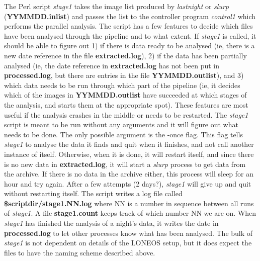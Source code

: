 \documentclass{article}
\newcommand\pr{\em}                   %
\newcommand\ff{\bf}                   %
\begin{document}
{The Perl script {\pr stage1} takes the image list produced by {\pr
lastnight} or {\pr slurp} ({\ff YYMMDD.inlist}) and passes the list to
the controller program {\pr control1} which performs the parallel
analysis.  The script has a few features to decide which files have
been analysed through the pipeline and to what extent.  If {\pr
stage1} is called, it should be able to figure out 1) if there is data
ready to be analysed (ie, there is a new date reference in the file
{\ff extracted.log}), 2) if the data has been partially analysed (ie,
the date reference in {\ff extracted.log} has not been put in {\ff
processed.log}, but there are entries in the file {\ff
YYMMDD.outlist}), and 3) which data needs to be run through which part
of the pipeline (ie, it decides which of the images in {\ff
YYMMDD.outlist} have succeeded at which stages of the analysis, and
starts them at the appropriate spot).  These features are most useful
if the analysis crashes in the middle or needs to be restarted.  The
{\pr stage1} script is meant to be run without any arguments and it
will figure out what needs to be done.  The only possible argument is
the -once flag.  This flag tells {\pr stage1} to analyse the data it
finds and quit when it finishes, and not call another instance of
itself.  Otherwise, when it is done, it will restart itself, and since
there is no new data in {\ff extracted.log}, it will start a {\pr
slurp} process to get data from the archive.  If there is no data in
the archive either, this process will sleep for an hour and try again.
After a few attempts (2 days?), {\pr stage1} will give up and quit
without restarting itself.  The script writes a log file called {\ff
\$scriptdir/stage1.NN.log} where NN is a number in sequence between
all runs of {\pr stage1}.  A file {\ff stage1.count} keeps track of
which number NN we are on.  When {\pr stage1} has finished the
analysis of a night's data, it writes the date in {\ff processed.log}
to let other processes know what has been analysed.  The bulk of {\pr
stage1} is not dependent on details of the LONEOS setup, but it does
expect the files to have the naming scheme described above.

}
\end{document}
